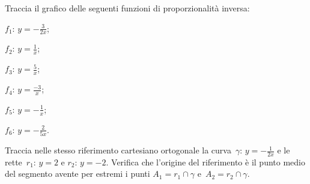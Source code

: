 
\begin{esercizio}
\label{ese:8.53}
Traccia il grafico delle seguenti funzioni di proporzionalità inversa:
\begin{multicols}{3}
 \begin{enumeratea}
\item $f_{1}:\, y=-{\frac{3}{2x}}$;
\item $f_{2}:\, y=\frac{1}{x}$;
\item $f_{3}:\, y=\frac{5}{x}$;
\item $f_{4}:\, y=\frac{-3}{x}$;
\item $f_{5}:\, y=-{\frac{1}{x}}$;
\item $f_{6}:\, y=-\frac{2}{5x}$.
\end{enumeratea}
\end{multicols}
\end{esercizio}

\begin{esercizio}
\label{ese:8.54}
Traccia nelle stesso riferimento cartesiano ortogonale la curva~$\gamma:\, y=-{\frac{1}{2x}}$ e le rette~$r_{1}:\, y=2$ e
$r_{2}:\, y=-2$. Verifica che l'origine del riferimento è il punto medio del segmento avente per estremi i punti
$A_{1}=r_{1}\cap \gamma$ e~$A_{2}=r_{2}\cap \gamma$.
\end{esercizio}

